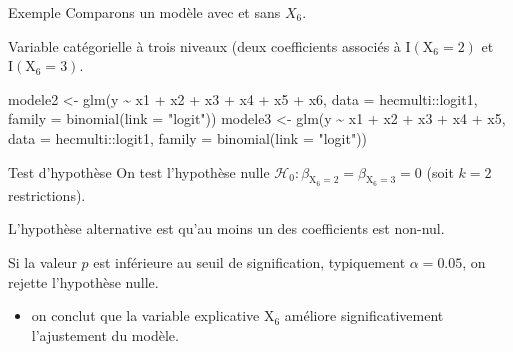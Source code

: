 \documentclass[
  ignorenonframetext,
]{beamer}
\newenvironment{Shaded}{\begin{snugshade}}{\end{snugshade}}
\newcommand{\AttributeTok}[1]{\textcolor[rgb]{0.40,0.45,0.13}{#1}}
\newcommand{\FunctionTok}[1]{\textcolor[rgb]{0.28,0.35,0.67}{#1}}
\newcommand{\NormalTok}[1]{\textcolor[rgb]{0.00,0.23,0.31}{#1}}
\newcommand{\OtherTok}[1]{\textcolor[rgb]{0.00,0.23,0.31}{#1}}
\newcommand{\SpecialCharTok}[1]{\textcolor[rgb]{0.37,0.37,0.37}{#1}}
\newcommand{\StringTok}[1]{\textcolor[rgb]{0.13,0.47,0.30}{#1}}
\providecommand{\tightlist}{%
  \setlength{\itemsep}{0pt}\setlength{\parskip}{0pt}}\usepackage{longtable,booktabs,array}
\begin{document}
\begin{frame}[fragile]{Exemple}
\protect\hypertarget{exemple}{}
Comparons un modèle avec et sans \(X_6\).

Variable catégorielle à trois niveaux (deux coefficients associés à
\(\mathrm{I}(\mathrm{X}_{6}=2)\) et \(\mathrm{I}(\mathrm{X}_{6}=3)\).

\begin{Shaded}
\begin{Highlighting}[numbers=left,,]
\NormalTok{modele2 }\OtherTok{\textless{}{-}}  \FunctionTok{glm}\NormalTok{(y }\SpecialCharTok{\textasciitilde{}}\NormalTok{ x1 }\SpecialCharTok{+}\NormalTok{ x2 }\SpecialCharTok{+}\NormalTok{ x3 }\SpecialCharTok{+}\NormalTok{ x4 }\SpecialCharTok{+}\NormalTok{ x5 }\SpecialCharTok{+}\NormalTok{ x6,}
                 \AttributeTok{data =}\NormalTok{ hecmulti}\SpecialCharTok{::}\NormalTok{logit1,}
                 \AttributeTok{family =} \FunctionTok{binomial}\NormalTok{(}\AttributeTok{link =} \StringTok{"logit"}\NormalTok{))}
\NormalTok{modele3 }\OtherTok{\textless{}{-}}  \FunctionTok{glm}\NormalTok{(y }\SpecialCharTok{\textasciitilde{}}\NormalTok{ x1 }\SpecialCharTok{+}\NormalTok{ x2 }\SpecialCharTok{+}\NormalTok{ x3 }\SpecialCharTok{+}\NormalTok{ x4 }\SpecialCharTok{+}\NormalTok{ x5,}
                 \AttributeTok{data =}\NormalTok{ hecmulti}\SpecialCharTok{::}\NormalTok{logit1,}
                 \AttributeTok{family =} \FunctionTok{binomial}\NormalTok{(}\AttributeTok{link =} \StringTok{"logit"}\NormalTok{)) }
\end{Highlighting}
\end{Shaded}
\end{frame}

\begin{frame}{Test d'hypothèse}
\protect\hypertarget{test-dhypothuxe8se}{}
On test l'hypothèse nulle
\(\mathscr{H}_0: \beta_{\mathrm{X}_6=2} = \beta_{\mathrm{X}_6=3} = 0\)
(soit \(k=2\) restrictions).

L'hypothèse alternative est qu'au moins un des coefficients est non-nul.

Si la valeur \(p\) est inférieure au seuil de signification, typiquement
\(\alpha = 0.05\), on rejette l'hypothèse nulle.

\begin{itemize}
\tightlist
\item
  on conclut que la variable explicative \(\mathrm{X}_6\) améliore
  significativement l'ajustement du modèle.
\end{itemize}
\end{frame}
\end{document}
